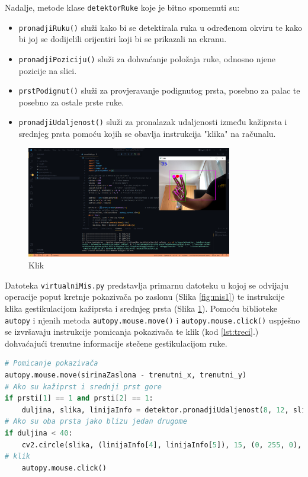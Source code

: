 \documentclass[]{foi} %
\begin{document}
\newpage
Nadalje, metode klase \texttt{detektorRuke} koje je bitno spomenuti su:

\begin{itemize}
    \item \texttt{pronadjiRuku()} služi kako bi se detektirala ruka u određenom okviru te kako bi joj se dodijelili orijentiri koji bi se prikazali na ekranu.
    \item \texttt{pronadjiPoziciju()} služi za dohvaćanje položaja ruke, odnosno njene pozicije na slici.
    \item \texttt{prstPodignut()} služi za provjeravanje podignutog prsta, posebno za palac te posebno za ostale prste ruke.
    \item \texttt{pronadjiUdaljenost()} služi za pronalazak udaljenosti između kažiprsta i srednjeg prsta pomoću kojih se obavlja instrukcija "klika" na računalu.
\end{itemize}

\begin{figure}[!ht]
    \centering
    \includegraphics[width=0.8\textwidth]{slike/mis2.png}
    \caption{Klik}
    \label{fig:mis2}
\end{figure}

Datoteka \texttt{virtualniMis.py} predstavlja primarnu datoteku u kojoj se odvijaju operacije poput kretnje pokazivača po zaslonu (Slika \ref{fig:mis1}) te instrukcije klika gestikulacijom kažiprsta i srednjeg prsta (Slika \ref{fig:mis2}).
Pomoću biblioteke \texttt{autopy} i njenih metoda \texttt{autopy.mouse.move()} i \texttt{autopy.mouse.click()} uspješno se izvršavaju instrukcije pomicanja pokazivača te klik (kod \ref{lst:treci}.) dohvaćajući trenutne informacije stečene gestikulacijom ruke.

\begin{lstlisting}[language=Python, caption={[Pomicanje pokazivača i klik] Pomicanje pokazivača i klik}, label=lst:treci]
# Pomicanje pokazivača
autopy.mouse.move(sirinaZaslona - trenutni_x, trenutni_y)
# Ako su kažiprst i srednji prst gore
if prsti[1] == 1 and prsti[2] == 1:     
    duljina, slika, linijaInfo = detektor.pronadjiUdaljenost(8, 12, slika)
# Ako su oba prsta jako blizu jedan drugome
if duljina < 40:
    cv2.circle(slika, (linijaInfo[4], linijaInfo[5]), 15, (0, 255, 0), cv2.FILLED)
# klik
    autopy.mouse.click()
\end{lstlisting}
\end{document}
